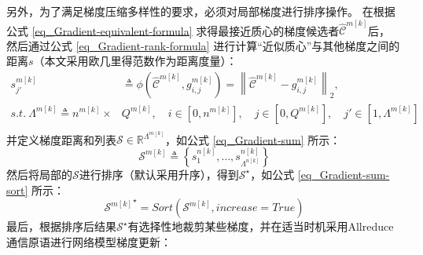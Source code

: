 \documentclass{xdupgthesis}
\begin{document}
另外，为了满足梯度压缩多样性的要求，必须对局部梯度进行排序操作。
在根据公式 \eqref{eq_Gradient-equivalent-formula} 求得最接近质心的梯度候选者$\hat{\mathcal{C}}^{m[k]}$后，
然后通过公式 \eqref{eq_Gradient-rank-formula} 进行计算“近似质心”与其他梯度之间的距离$s$（本文采用欧几里得范数作为距离度量）：
\begin{equation}
    \begin{aligned}
        s_{j'}^{m[k]} &\triangleq \phi\left(\hat{\mathcal{C}}^{m[k]}, g_{i, j}^{m[k]} \right) =
            \left\lVert \hat{\mathcal{C}}^{m[k]} - g_{i, j}^{m[k]} \right\rVert_2, \\
        s.t. \ \Lambda^{m[k]} \triangleq
            n^{m[k]} \times & Q^{m[k]},
        \quad i \in \left[ 0, n^{m[k]} \right],
        \quad j \in \left[ 0, Q^{m[k]} \right],
        \quad j'\in\left[1, \Lambda^{m[k]} \right] \\
    \end{aligned}
    \label{eq_Gradient-rank-formula}
\end{equation}
并定义梯度距离和列表$\mathcal{S}\in \mathbb{R}^{\Lambda^{m[k]}}$，如公式 \eqref{eq_Gradient-sum} 所示：
\begin{equation}
    \mathcal{S}^{m[k]} \triangleq 
        \left\{ 
            s_{1}^{n[k]}, \dots, s_{\Lambda^{n[k]}}^{n[k]} 
        \right\}
    \label{eq_Gradient-sum}
\end{equation}
然后将局部的$\mathcal{S}$进行排序（默认采用升序），得到$\mathcal{S}^\star$，如公式 \eqref{eq_Gradient-sum-sort} 所示：
\begin{equation}
    {\mathcal{S}^{m[k]}}^\star = Sort\left(
            \mathcal{S}^{m[k]}, increase=True
        \right)
    \label{eq_Gradient-sum-sort}
\end{equation}
最后，根据排序后结果$\mathcal{S}^\star$有选择性地裁剪某些梯度，并在适当时机采用Allreduce通信原语进行网络模型梯度更新：
\end{document}
